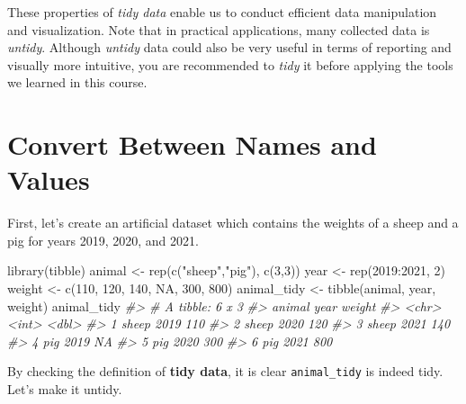 \documentclass[
]{book}
\newenvironment{Shaded}{\begin{snugshade}}{\end{snugshade}}
\newcommand{\CommentTok}[1]{\textcolor[rgb]{0.56,0.35,0.01}{\textit{#1}}}
\newcommand{\ConstantTok}[1]{\textcolor[rgb]{0.00,0.00,0.00}{#1}}
\newcommand{\DecValTok}[1]{\textcolor[rgb]{0.00,0.00,0.81}{#1}}
\newcommand{\FunctionTok}[1]{\textcolor[rgb]{0.00,0.00,0.00}{#1}}
\newcommand{\NormalTok}[1]{#1}
\newcommand{\OtherTok}[1]{\textcolor[rgb]{0.56,0.35,0.01}{#1}}
\newcommand{\SpecialCharTok}[1]{\textcolor[rgb]{0.00,0.00,0.00}{#1}}
\newcommand{\StringTok}[1]{\textcolor[rgb]{0.31,0.60,0.02}{#1}}
\begin{document}
These properties of \emph{tidy data} enable us to conduct efficient data manipulation and visualization. Note that in practical applications, many collected data is \emph{untidy}. Although \emph{untidy} data could also be very useful in terms of reporting and visually more intuitive, you are recommended to \emph{tidy} it before applying the tools we learned in this course.

\hypertarget{tidy-name-value}{%
\section{Convert Between Names and Values}\label{tidy-name-value}}

First, let's create an artificial dataset which contains the weights of a sheep and a pig for years 2019, 2020, and 2021.

\begin{Shaded}
\begin{Highlighting}[]
\FunctionTok{library}\NormalTok{(tibble)}
\NormalTok{animal }\OtherTok{\textless{}{-}} \FunctionTok{rep}\NormalTok{(}\FunctionTok{c}\NormalTok{(}\StringTok{"sheep"}\NormalTok{,}\StringTok{"pig"}\NormalTok{), }\FunctionTok{c}\NormalTok{(}\DecValTok{3}\NormalTok{,}\DecValTok{3}\NormalTok{))}
\NormalTok{year }\OtherTok{\textless{}{-}} \FunctionTok{rep}\NormalTok{(}\DecValTok{2019}\SpecialCharTok{:}\DecValTok{2021}\NormalTok{, }\DecValTok{2}\NormalTok{)}
\NormalTok{weight }\OtherTok{\textless{}{-}} \FunctionTok{c}\NormalTok{(}\DecValTok{110}\NormalTok{, }\DecValTok{120}\NormalTok{, }\DecValTok{140}\NormalTok{, }\ConstantTok{NA}\NormalTok{, }\DecValTok{300}\NormalTok{, }\DecValTok{800}\NormalTok{)}
\NormalTok{animal\_tidy }\OtherTok{\textless{}{-}} \FunctionTok{tibble}\NormalTok{(animal, year, weight)}
\NormalTok{animal\_tidy}
\CommentTok{\#\textgreater{} \# A tibble: 6 x 3}
\CommentTok{\#\textgreater{}   animal  year weight}
\CommentTok{\#\textgreater{}   \textless{}chr\textgreater{}  \textless{}int\textgreater{}  \textless{}dbl\textgreater{}}
\CommentTok{\#\textgreater{} 1 sheep   2019    110}
\CommentTok{\#\textgreater{} 2 sheep   2020    120}
\CommentTok{\#\textgreater{} 3 sheep   2021    140}
\CommentTok{\#\textgreater{} 4 pig     2019     NA}
\CommentTok{\#\textgreater{} 5 pig     2020    300}
\CommentTok{\#\textgreater{} 6 pig     2021    800}
\end{Highlighting}
\end{Shaded}

By checking the definition of \textbf{tidy data}, it is clear \texttt{animal\_tidy} is indeed tidy. Let's make it untidy.
\end{document}
